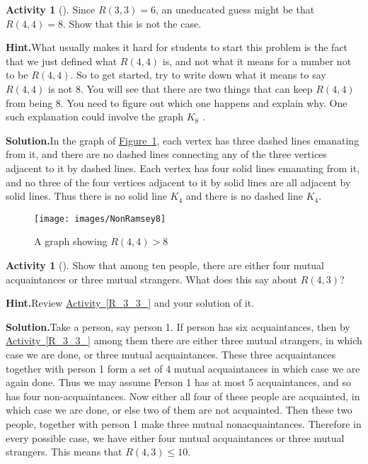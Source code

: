 \documentclass[10pt,]{book}
\theoremstyle{plain}
\theoremstyle{definition}
\newtheorem{activity}[project]{Activity}
\numberwithin{equation}{chapter}
\newcommand{\gt}{>}
\begin{document}
\begin{activity}[]\label{activity-67}
Since \(R(3,3)=6\), an uneducated guess might be that \(R(4,4)=8\). Show that this is not the case.%
\par\medskip\noindent%
\textbf{Hint.}\quad What usually makes it hard for students to start this problem is the fact that we just defined what \(R(4, 4)\) is, and not what it means for a number not to be \(R(4, 4)\). So to get started, try to write down what it means to say \(R(4, 4)\) is not 8. You will see that there are two things that can keep \(R(4, 4)\) from being 8. You need to figure out which one happens and explain why. One such explanation could involve the graph \(K_8\) .%
\par\medskip\noindent%
\textbf{Solution.}\quad In the graph of \hyperref[NonRamsey8]{Figure~\ref{NonRamsey8}}, each vertex has three dashed lines emanating from it, and there are no dashed lines connecting any of the three vertices adjacent to it by dashed lines. Each vertex has four solid lines emanating from it, and no three of the four vertices adjacent to it by solid lines are all adjacent by solid lines. Thus there is no solid line \(K_4\) and there is no dashed line \(K_4\).%
\begin{figure}
\centering
\texttt{[image: images/NonRamsey8]}
\caption{A graph showing \(R(4,4) \gt 8\)\label{NonRamsey8}}
\end{figure}
\end{activity}
\begin{activity}[]\label{not_R_4_3}
Show that among ten people, there are either four mutual acquaintances or three mutual strangers. What does this say about \(R(4,3)\)?%
\par\medskip\noindent%
\textbf{Hint.}\quad Review \hyperref[R_3_3_]{Activity~\ref{R_3_3_}} and your solution of it.%
\par\medskip\noindent%
\textbf{Solution.}\quad Take a person, say person 1. If person has six acquaintances, then by \hyperref[R_3_3_]{Activity~\ref{R_3_3_}} among them there are either three mutual strangers, in which case we are done, or three mutual acquaintances. These three acquaintances together with person 1 form a set of 4 mutual acquaintances in which case we are again done. Thus we may assume Person 1 has at most 5 acquaintances, and so has four non-acquaintances. Now either all four of these people are acquainted, in which case we are done, or else two of them are not acquainted. Then these two people, together with person 1 make three mutual nonacquaintances. Therefore in every possible case, we have either four mutual acquaintances or three mutual strangers. This means that \(R(4,3) \le 10\).%
\end{activity}
\end{document}
